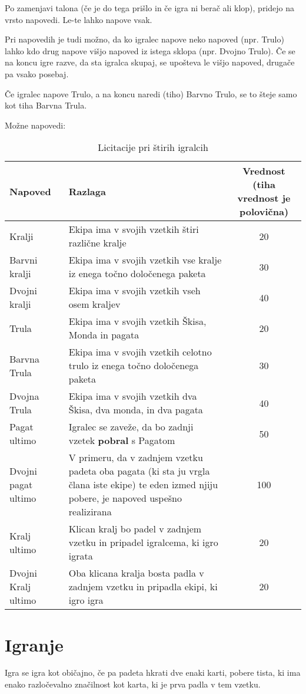 \documentclass[a4paper, ]{report}
\begin{document}
Po zamenjavi talona (če je do tega prišlo in če igra ni berač ali klop), pridejo na vrsto napovedi. Le-te lahko napove vsak.

Pri napovedih je tudi možno, da ko igralec napove neko napoved (npr. Trulo) lahko kdo drug napove višjo napoved iz istega sklopa (npr. Dvojno Trulo). Če se na koncu igre razve, da sta igralca skupaj, se upošteva le višjo napoved, drugače pa vsako posebaj.

Če igralec napove Trulo, a na koncu naredi (tiho) Barvno Trulo, se to šteje samo kot tiha Barvna Trula.

Možne napovedi:
\begin{table}
  \caption{Licitacije pri štirih igralcih}
  \begin{tabularx}{\textwidth}{lXc}
    \toprule
    \textbf{Napoved} & \textbf{Razlaga} & \parbox{25mm}{\textbf{Vrednost} \\ (tiha vrednost je polovična)} \\ \toprule
    Kralji & Ekipa ima v svojih vzetkih štiri različne kralje & 20 \\ \hline
    Barvni kralji & Ekipa ima v svojih vzetkih vse kralje iz enega točno določenega paketa & 30 \\ \hline %
    Dvojni kralji & Ekipa ima v svojih vzetkih vseh osem kraljev & 40 \\ \midrule
    Trula & Ekipa ima v svojih vzetkih Škisa, Monda in pagata & 20 \\ \hline
    Barvna Trula & Ekipa ima v svojih vzetkih celotno trulo iz enega točno določenega paketa & 30 \\ \hline %
    Dvojna Trula & Ekipa ima v svojih vzetkih dva Škisa, dva monda, in dva pagata & 40 \\ \midrule
    Pagat ultimo & Igralec se zaveže, da bo zadnji vzetek \textbf{pobral} s Pagatom & 50 \\ \hline
    Dvojni pagat ultimo & V primeru, da v zadnjem vzetku padeta oba pagata (ki sta ju vrgla člana iste ekipe) te eden izmed njiju pobere, je napoved uspešno realizirana & 100 \\ \midrule
    Kralj ultimo & Klican kralj bo padel v zadnjem vzetku in pripadel igralcema, ki igro igrata & 20 \\ \hline
    Dvojni Kralj ultimo & Oba klicana kralja bosta padla v zadnjem vzetku in pripadla ekipi, ki igro igra & 20 \\ \bottomrule
  \end{tabularx}
\end{table}

\chapter{Igranje}

Igra se igra kot običajno, če pa padeta hkrati dve enaki karti, pobere tista, ki ima enako razločevalno značilnost kot karta, ki je prva padla v tem vzetku.
\end{document}
